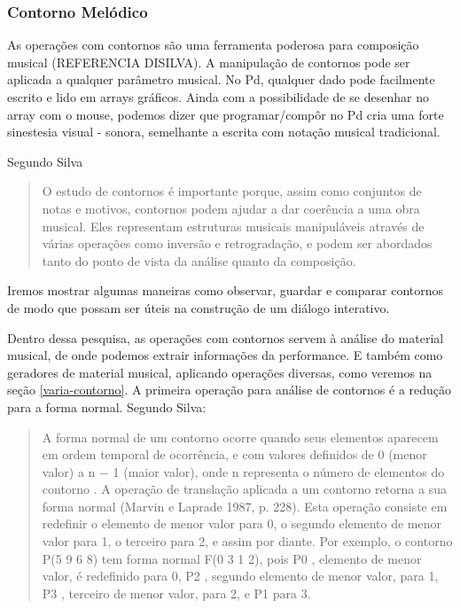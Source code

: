 \documentclass{ppgmus}
\begin{document}
\subsubsection{Contorno Melódico}
\label{contornos}


As operações com contornos são uma ferramenta poderosa para
composição musical (REFERENCIA DISILVA). A manipulação de contornos
pode ser aplicada a qualquer parâmetro musical.
No Pd, qualquer dado pode facilmente escrito e lido em arrays gráficos.
Ainda com a possibilidade de se desenhar no array com o mouse, podemos
dizer que programar/compôr no Pd cria uma
forte sinestesia visual - sonora, semelhante a escrita
com notação musical tradicional.

Segundo Silva \begin{quotation}
               O estudo de contornos é importante porque, assim como conjuntos de notas e motivos,
               contornos podem ajudar a dar coerência a uma obra musical. Eles representam estruturas
		musicais manipuláveis através de várias operações como inversão e retrogradação, e podem
		ser abordados tanto do ponto de vista da análise quanto da composição.
              \end{quotation} 


Iremos mostrar algumas maneiras como observar, guardar e comparar contornos de modo
que possam ser úteis na construção de um diálogo interativo.

Dentro dessa pesquisa, as operações com contornos servem à análise do material musical,
de onde podemos extrair informações da performance. E também como geradores de material
musical, aplicando operações diversas, como veremos na seção \ref{varia-contorno}.
A primeira operação para análise de contornos é a redução para a forma normal. Segundo Silva:

\begin{quotation}
 A forma normal de um contorno ocorre quando seus elementos aparecem em ordem
temporal de ocorrência, e com valores definidos de 0 (menor valor) a n − 1 (maior valor),
onde n  representa o número de elementos do contorno . A operação de translação aplicada a um
contorno retorna a sua forma normal (Marvin e Laprade 1987, p. 228). Esta operação
consiste em redefinir o elemento de menor valor para 0, o segundo elemento de menor
valor para 1, o terceiro para 2, e assim por diante. Por exemplo, o contorno P(5 9 6 8)
tem forma normal F(0 3 1 2), pois P0 , elemento de menor valor, é redefinido para 0, P2 ,
segundo elemento de menor valor, para 1, P3 , terceiro de menor valor, para 2, e P1 para
3.
\end{quotation}
\end{document}
